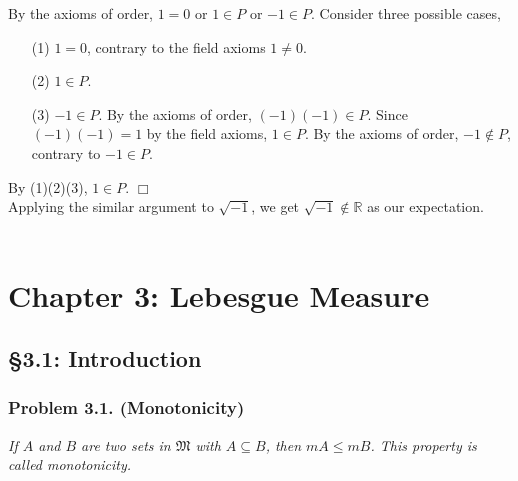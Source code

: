 \documentclass{article}
\begin{document}
By the axioms of order,
$1 = 0$ or $1 \in P$ or $-1 \in P$.
Consider three possible cases,
\begin{enumerate}
\item[(1)]
$1 = 0$, contrary to the field axioms $1 \neq 0$.
\item[(2)]
$1 \in P$.
\item[(3)]
$-1 \in P$.
By the axioms of order, $(-1)(-1) \in P$.
Since $(-1)(-1) = 1$ by the field axioms, $1 \in P$.
By the axioms of order, $-1 \not\in P$, contrary to $-1 \in P$.
\end{enumerate}
By (1)(2)(3), $1 \in P$.
$\Box$ \\

Applying the similar argument to $\sqrt{-1}$,
we get $\sqrt{-1} \not\in \mathbb{R}$
as our expectation. \\\\






\newpage
\section*{Chapter 3: Lebesgue Measure \\}



\subsection*{\S 3.1: Introduction \\}



\subsubsection*{Problem 3.1. (Monotonicity)}
\emph{If $A$ and $B$ are two sets in $\mathfrak{M}$ with
$A \subseteq B$, then $mA \leq mB$.
This property is called monotonicity.} \\
\end{document}
